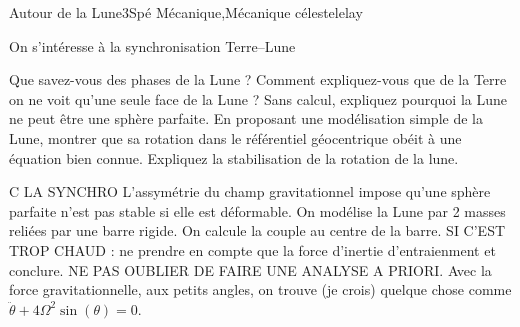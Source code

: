 
\begin{exercise}{Autour de la Lune}{3}{Spé}
{Mécanique,Mécanique céleste}{lelay}

On s'intéresse à la synchronisation Terre--Lune
\begin{questions}
        \question Que savez-vous des phases de la Lune ? Comment expliquez-vous que de la Terre on ne voit qu'une seule face de la Lune ?
        \question Sans calcul, expliquez pourquoi la Lune ne peut être une sphère parfaite.
        \question En proposant une modélisation simple de la Lune, montrer que sa rotation dans le référentiel géocentrique obéit à une équation bien connue.
        \question Expliquez la stabilisation de la rotation de la lune.
\end{questions}

\end{exercise}

\begin{solution}
\begin{questions}
    \question C LA SYNCHRO
    \question L'assymétrie du champ gravitationnel impose qu'une sphère parfaite n'est pas stable si elle est déformable.
    \question On modélise la Lune par 2 masses reliées par une barre rigide. On calcule la couple au centre de la barre. SI C'EST TROP CHAUD : ne prendre en compte que la force d'inertie d'entraienment et conclure. NE PAS OUBLIER DE FAIRE UNE ANALYSE A PRIORI. Avec la force gravitationnelle, aux petits angles, on trouve (je crois) quelque chose comme $\ddot{\theta} + 4\Omega^2 \sin(\theta) = 0$.
\end{questions}
\end{solution}